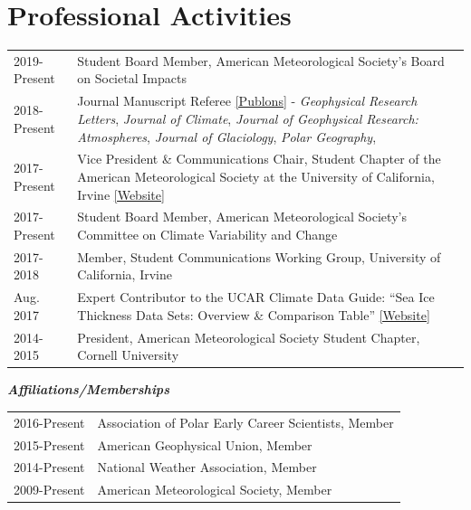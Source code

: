 \documentclass[margin,line,palatino,courier,10pt]{res}
\begin{document}
\begin{resume}
\vspace{-0.1in}
\noindent\textcolor{Cerulean}{\makebox[\linewidth][r]{\rule{\textwidth}{5pt}}}
\section{\sc \textcolor{Cerulean}{\large{\textbf{Professional Activities}}}}
\vspace*{0.05in}
\begin{tabular}{@{}p{0.9in}p{4in}}
2019-Present & Student Board Member, American Meteorological Society's Board on Societal Impacts\\
2018-Present & Journal Manuscript Referee \href{https://publons.com/author/1521902/zachary-labe#profile}{[Publons]} - \textit{Geophysical Research Letters}, \textit{Journal of Climate}, \textit{Journal of Geophysical Research: Atmospheres}, \textit{Journal of Glaciology}, \textit{Polar Geography},\\
2017-Present & Vice President \& Communications Chair, Student Chapter of the American Meteorological Society at the University of California, Irvine \href{http://sites.uci.edu/zotcams/}{[Website]}\\
2017-Present & Student Board Member, American Meteorological Society's Committee on Climate Variability and Change\\
2017-2018 & Member, Student Communications Working Group, University of California, Irvine\\
Aug. 2017 & Expert Contributor to the UCAR Climate Data Guide: ``Sea Ice Thickness Data Sets: Overview \& Comparison Table'' \href{https://climatedataguide.ucar.edu/climate-data/sea-ice-thickness-data-sets-overview-comparison-table}{[Website]}\\
2014-2015 & President, American Meteorological Society Student Chapter, Cornell University\\
\end{tabular}

\textit{\textbf{Affiliations/Memberships}}
\vspace*{0.05in}\\
\begin{tabular}{@{}p{0.9in}p{4in}}
2016-Present & Association of Polar Early Career Scientists, Member\\ 
2015-Present & American Geophysical Union, Member\\
2014-Present & National Weather Association, Member\\
2009-Present & American Meteorological Society, Member\\
\end{tabular}


\end{resume}
\end{document}
